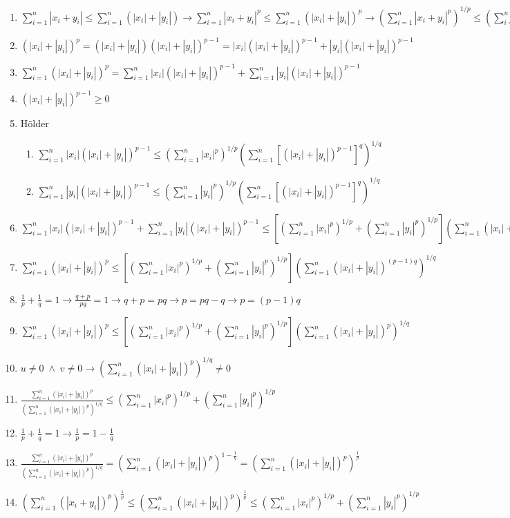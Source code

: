 \begin{enumerate}
	\item $\sum_{i=1}^n |x_i + y_i| \leq \sum_{i=1}^n \left( |x_i| + |y_i| \right) \to \sum_{i=1}^n |x_i + y_i|^p \leq \sum_{i=1}^n \left( |x_i| + |y_i| \right)^p \to \left( \sum_{i=1}^n |x_i + y_i|^p \right)^{1/p} \leq \left( \sum_{i=1}^n \left( |x_i| + |y_i| \right)^p \right)^{1/p}$
	\item $(|x_i| + |y_i|)^p = (|x_i| + |y_i|) (|x_i| + |y_i|)^{p-1} = |x_i| (|x_i| + |y_i|)^{p-1} + |y_i| (|x_i| + |y_i|)^{p-1}$
	\item $\sum_{i=1}^n (|x_i| + |y_i|)^p = \sum_{i=1}^n |x_i| (|x_i| + |y_i|)^{p-1} + \sum_{i=1}^n |y_i| (|x_i| + |y_i|)^{p-1} $
	\item $(|x_i| + |y_i|)^{p-1} \geq 0$
	\item H\"{o}lder
	\begin{enumerate}
		\item $\sum_{i=1}^n |x_i| (|x_i| + |y_i|)^{p-1} \leq \left( \sum_{i=1}^n |x_i|^p \right)^{1/p} \left( \sum_{i=1}^n \left[ (|x_i| + |y_i|)^{p-1} \right]^q \right)^{1/q}$
		\item $\sum_{i=1}^n |y_i| (|x_i| + |y_i|)^{p-1} \leq \left( \sum_{i=1}^n |y_i|^p \right)^{1/p} \left( \sum_{i=1}^n \left[ (|x_i| + |y_i|)^{p-1} \right]^q \right)^{1/q}$
	\end{enumerate}
	\item $\sum_{i=1}^n |x_i| (|x_i| + |y_i|)^{p-1} + \sum_{i=1}^n |y_i| (|x_i| + |y_i|)^{p-1} \leq \left[ \left( \sum_{i=1}^n |x_i|^p \right)^{1/p} + \left( \sum_{i=1}^n |y_i|^p \right)^{1/p} \right] \left( \sum_{i=1}^n (|x_i| + |y_i|)^{(p-1)q} \right)^{1/q}$
	\item $\sum_{i=1}^n (|x_i| + |y_i|)^p \leq \left[ \left( \sum_{i=1}^n |x_i|^p \right)^{1/p} + \left( \sum_{i=1}^n |y_i|^p \right)^{1/p} \right] \left( \sum_{i=1}^n (|x_i| + |y_i|)^{(p-1)q} \right)^{1/q}$
	\item $\frac{1}{p} + \frac{1}{q} = 1 \to \frac{q+p}{pq} = 1 \to q+p = pq \to p = pq - q \to p = (p-1)q$
	\item $\sum_{i=1}^n (|x_i| + |y_i|)^p \leq \left[ \left( \sum_{i=1}^n |x_i|^p \right)^{1/p} + \left( \sum_{i=1}^n |y_i|^p \right)^{1/p} \right] \left( \sum_{i=1}^n (|x_i| + |y_i|)^p \right)^{1/q}$
	\item $u \neq 0 \; \wedge \; v \neq 0 \to \left( \sum_{i=1}^n (|x_i| + |y_i|)^p \right)^{1/q} \neq 0$
	\item $\frac{\sum_{i=1}^n (|x_i| + |y_i|)^p}{\left( \sum_{i=1}^n (|x_i| + |y_i|)^p \right)^{1/q}} \leq \left( \sum_{i=1}^n |x_i|^p \right)^{1/p} + \left( \sum_{i=1}^n |y_i|^p \right)^{1/p} $
	\item $\frac{1}{p} + \frac{1}{q} = 1 \to \frac{1}{p} = 1 - \frac{1}{q}$
	\item $\frac{\sum_{i=1}^n (|x_i| + |y_i|)^p}{\left( \sum_{i=1}^n (|x_i| + |y_i|)^p \right)^{1/q}} = \left( \sum_{i=1}^n (|x_i| + |y_i|)^p \right)^{1-\frac{1}{q}} = \left( \sum_{i=1}^n (|x_i| + |y_i|)^p \right)^{\frac{1}{p}}$
	\item $ \left( \sum_{i=1}^n (|x_i + y_i|)^p \right)^{\frac{1}{p}} \leq \left( \sum_{i=1}^n (|x_i| + |y_i|)^p \right)^{\frac{1}{p}} \leq \left( \sum_{i=1}^n |x_i|^p \right)^{1/p} + \left( \sum_{i=1}^n |y_i|^p \right)^{1/p}$
\end{enumerate}
